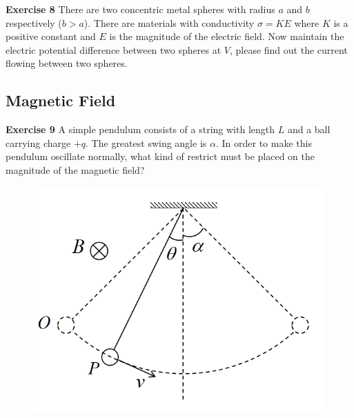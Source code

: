\documentclass{beamer}
\begin{document}
\begin{frame}{\bf Exercise 8}
    There are two concentric metal spheres with radius $a$ 
    and $b$ respectively ($b>a$). There are materials with 
    conductivity $\sigma=KE$ where $K$ is a positive constant 
    and $E$ is the magnitude of the electric field. Now 
    maintain the electric potential difference between 
    two spheres at $V$, please find out the current flowing 
    between two spheres.
\end{frame}



\subsection{\bf Magnetic Field}

\begin{frame}{\bf Exercise 9}
    A simple pendulum consists of a string with length $L$ 
    and a ball carrying charge $+q$. The greatest swing angle is $\alpha$. 
    In order to make this pendulum oscillate normally, what kind of restrict 
    must be placed on the magnitude of the magnetic field?

    \begin{figure}
        \centering
        \includegraphics[scale=0.6]{images/005.png}
    \end{figure}
\end{frame}
\end{document}
